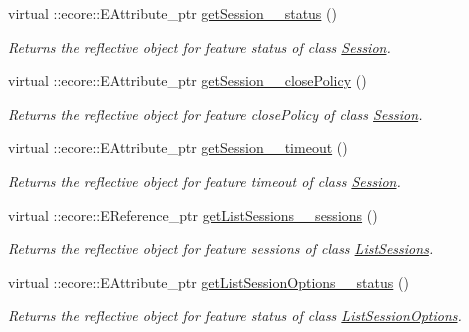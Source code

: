 \begin{DoxyCompactItemize}
virtual ::ecore::EAttribute\_\-ptr \hyperlink{classUMS__Data_1_1UMS__DataPackage_a7997fa80412a26a71f9e93b11a9abb21}{getSession\_\-\_\-status} ()
\begin{DoxyCompactList}\small\item\em Returns the reflective object for feature status of class \hyperlink{classUMS__Data_1_1Session}{Session}. \item\end{DoxyCompactList}\item 
virtual ::ecore::EAttribute\_\-ptr \hyperlink{classUMS__Data_1_1UMS__DataPackage_a0aa0c033e961db5d91ccf762bf0b9e68}{getSession\_\-\_\-closePolicy} ()
\begin{DoxyCompactList}\small\item\em Returns the reflective object for feature closePolicy of class \hyperlink{classUMS__Data_1_1Session}{Session}. \item\end{DoxyCompactList}\item 
virtual ::ecore::EAttribute\_\-ptr \hyperlink{classUMS__Data_1_1UMS__DataPackage_a23f35e35f57662b897665ce989da56d2}{getSession\_\-\_\-timeout} ()
\begin{DoxyCompactList}\small\item\em Returns the reflective object for feature timeout of class \hyperlink{classUMS__Data_1_1Session}{Session}. \item\end{DoxyCompactList}\item 
virtual ::ecore::EReference\_\-ptr \hyperlink{classUMS__Data_1_1UMS__DataPackage_a7d6cd483b071d1836f5c135ec256ba9d}{getListSessions\_\-\_\-sessions} ()
\begin{DoxyCompactList}\small\item\em Returns the reflective object for feature sessions of class \hyperlink{classUMS__Data_1_1ListSessions}{ListSessions}. \item\end{DoxyCompactList}\item 
virtual ::ecore::EAttribute\_\-ptr \hyperlink{classUMS__Data_1_1UMS__DataPackage_a7b058e4101c3a07f5d28fdc5d3416a9e}{getListSessionOptions\_\-\_\-status} ()
\begin{DoxyCompactList}\small\item\em Returns the reflective object for feature status of class \hyperlink{classUMS__Data_1_1ListSessionOptions}{ListSessionOptions}. \item\end{DoxyCompactList}\item 

\end{DoxyCompactItemize}
